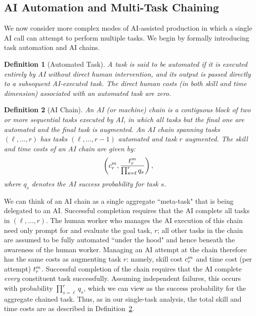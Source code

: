 \documentclass{article}
\theoremstyle{plain}
\theoremstyle{plain}
\newtheorem{definition}{Definition}
\begin{document}

\subsection{AI Automation and Multi-Task Chaining}

We now consider more complex modes of AI-assisted production in which a single AI call can attempt to perform multiple tasks.  We begin by formally introducing task automation and AI chains.
\begin{definition}[Automated Task]
\label{def:automated_task}
A task is said to be automated if it is executed entirely by AI without direct human intervention, and its output is passed directly to a subsequent AI-executed task. The direct human costs (in both skill and time dimension) associated with an automated task are zero.
\end{definition}

\begin{definition}[AI Chain]
\label{def:ai_chain}
An AI (or machine) chain is a contiguous block of two or more sequential tasks executed by AI, in which all tasks but the final one are automated and the final task is augmented.
An AI chain spanning tasks $(\ell,\dots,r)$ has tasks $(\ell,\dots,r-1)$ automated and task $r$ augmented.
The skill and time costs of an AI chain are given by:
\[
\left(c^{m}_{r}, \frac{t^{m}_{r}}{\prod_{s=\ell}^{r} q_s}\right),
\]
where $q_s$ denotes the AI success probability for task $s$.
\end{definition}

We can think of an AI chain as a single aggregate ``meta-task" that is being delegated to an AI.  Successful completion requires that the AI complete all tasks in $(\ell, \dotsc, r)$.  The human worker who manages the AI execution of this chain need only prompt for and evaluate the goal task, $r$; all other tasks in the chain are assumed to be fully automated ``under the hood" and hence beneath the awareness of the human worker.  Managing an AI attempt at the chain therefore has the same costs as augmenting task $r$: namely, skill cost $c^{m}_{r}$ and time cost (per attempt) $t^{m}_{r}$.  Successful completion of the chain requires that the AI complete \emph{every} constituent task successfully.  Assuming independent failures, this occurs with probability $\prod_{s=\ell}^r q_s$, which we can view as the success probability for the aggregate chained task.  Thus, as in our single-task analysis, the total skill and time costs are as described in Definition~\ref{def:ai_chain}.
\end{document}
